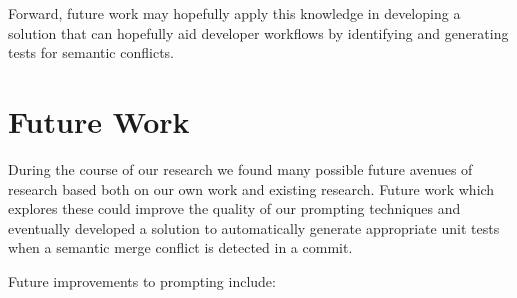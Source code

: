 Forward, future work may hopefully apply this knowledge in developing a solution that can hopefully aid developer workflows by identifying and generating tests for semantic conflicts.

\section{Future Work}

During the course of our research we found many possible future avenues of research based both on our own work and existing research. Future work which explores these could improve
the quality of our prompting techniques and eventually developed a solution to automatically generate appropriate unit tests when a semantic merge conflict is detected in a commit.

Future improvements to prompting include:
%
